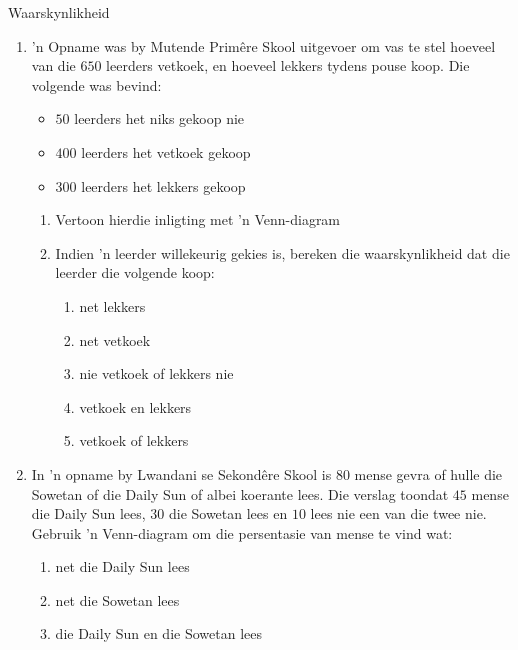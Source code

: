 \begin{eocexercises}{Waarskynlikheid}
\begin{enumerate}[itemsep=5pt, label=\textbf{\arabic*}.]
  \item 'n Opname was by Mutende Primêre Skool uitgevoer om vas te stel hoeveel van die $ 650 $ leerders vetkoek, en hoeveel lekkers tydens pouse koop. Die volgende was bevind:
\begin{itemize}
 \item $50$ leerders het niks gekoop nie
\item $400$ leerders het vetkoek gekoop
\item $300$ leerders het lekkers gekoop
\end{itemize}
\begin{enumerate}[noitemsep, label=\textbf{(\alph*)} ]
 \item Vertoon hierdie inligting met 'n Venn-diagram
\item Indien 'n leerder willekeurig gekies is, bereken die waarskynlikheid dat die leerder die volgende koop:
 \begin{enumerate}[noitemsep, label=\textbf{\roman*.} ]
 \item net lekkers
\item net vetkoek
\item nie vetkoek of lekkers nie
\item vetkoek en lekkers
\item vetkoek of lekkers
\end{enumerate}
\end{enumerate}
\item In 'n opname by Lwandani se Sekondêre Skool is $80$ mense gevra of hulle die Sowetan of die Daily Sun of albei koerante lees. Die verslag toondat $45$ mense die Daily Sun lees, $30$ die Sowetan lees en $10$ lees nie een van die twee nie. Gebruik 'n Venn-diagram om die persentasie van mense te vind wat:
\begin{enumerate}[noitemsep, label=\textbf{(\alph*)} ]
 \item net die Daily Sun lees
\item net die Sowetan lees
\item die Daily Sun en die Sowetan lees
\end{enumerate}

  \end{enumerate}


\end{eocexercises}

